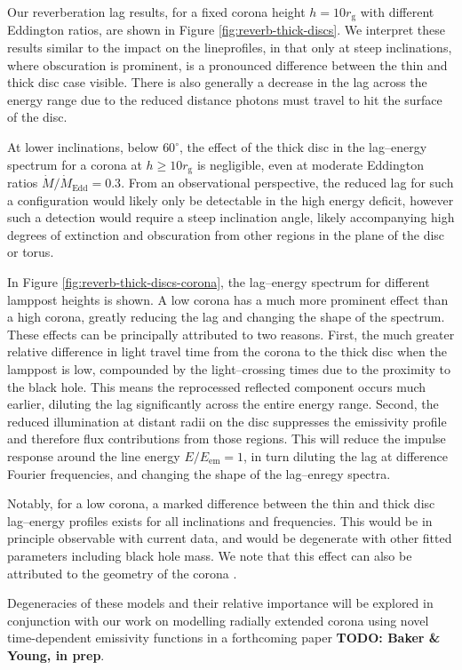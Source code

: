 \documentclass[fleqn,usenatbib]{mnras}
\newcommand{\todo}[1]{{\noindent \bf \color{red} TODO: #1}}
\newcommand{\rg}{r_\text{g}}
\begin{document}
Our reverberation lag results, for a fixed corona height $h=10 \rg$ with
different Eddington ratios, are shown in Figure \ref{fig:reverb-thick-discs}. We
interpret these results similar to the impact on the lineprofiles, in that only
at steep inclinations, where obscuration is prominent, is a pronounced
difference between the thin and thick disc case visible. There is also generally a decrease in the lag
across the energy range due to the reduced distance photons must travel to hit
the surface of the disc.

At lower inclinations, below $60^\circ$, the effect of the thick disc in the
lag--energy spectrum for a corona at $h \geq 10 \rg$ is negligible, even at
moderate Eddington ratios $\dot{M} / \dot{M}_\text{Edd} = 0.3$. From an
observational perspective, the reduced lag for such a configuration would likely
only be detectable in the high energy deficit, however such a detection would
require a steep inclination angle, likely accompanying high degrees of
extinction and obscuration from other regions in the plane of the disc or torus.

In Figure \ref{fig:reverb-thick-discs-corona}, the lag--energy spectrum for
different lamppost heights is shown. A low corona has a much more prominent
effect than a high corona, greatly reducing the lag and changing the shape of
the spectrum. These effects can be principally attributed to two reasons. First,
the much greater relative difference in light travel time from the corona to the
thick disc when the lamppost is low, compounded by the light--crossing times due
to the proximity to the black hole. This means the reprocessed reflected
component occurs much earlier, diluting the lag significantly across the entire
energy range. Second, the reduced illumination at distant radii on the disc
suppresses the emissivity profile and therefore flux contributions from those
regions. This will reduce the impulse response around the line energy $E /
E_\text{em} =
1$, in turn diluting the lag at difference Fourier frequencies, and changing the
shape of the lag--enregy spectra.

Notably, for a low corona, a marked difference between the thin and thick disc
lag--energy profiles exists for all inclinations and frequencies. This would be
in principle observable with current data, and would be degenerate with other
fitted parameters including black hole mass. We note that this effect can also
be attributed to the geometry of the corona \citep[see
e.g.][]{wilkins_towards_2016}.

Degeneracies of these models and their relative importance will be explored in
conjunction with our work on modelling radially extended corona using novel
time-dependent emissivity functions in a forthcoming paper \todo{Baker \& Young,
in prep}.
\end{document}
